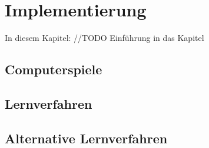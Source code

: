 \chapter{Implementierung}
\label{cha:Implementierung}

In diesem Kapitel: //TODO Einführung in das Kapitel

\section{Computerspiele}

\section{Lernverfahren}

\section{Alternative Lernverfahren}

